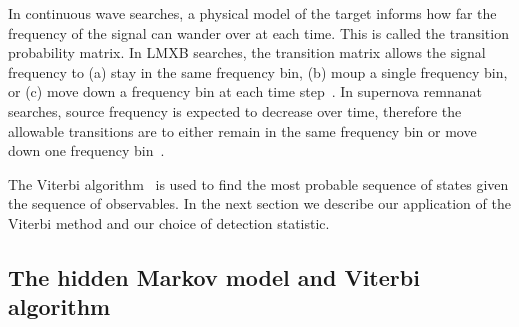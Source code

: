 \documentclass[paper-main.tex]{subfiles}
\begin{document}
In continuous wave searches, a physical model of the target informs how far the frequency of the signal can wander over at each time. 
This is called the transition probability matrix. 
In LMXB searches, the transition matrix allows the signal frequency to (a) stay in the same frequency bin, (b) moup a single frequency bin, or (c) move down a frequency bin at each time step~\cite{}. 
In supernova remnanat searches, source frequency is expected to decrease over time, therefore the allowable transitions are to either remain in the same frequency bin or move down one frequency bin~\cite{}. 


The Viterbi algorithm~\cite{Viterbi:1967} is used to find the most probable sequence of states given the sequence of observables.
In the next section we describe our application of the Viterbi method and our choice of detection statistic. 




\subsection{The hidden Markov model and Viterbi algorithm}
\label{sec:viterbi}
\end{document}
